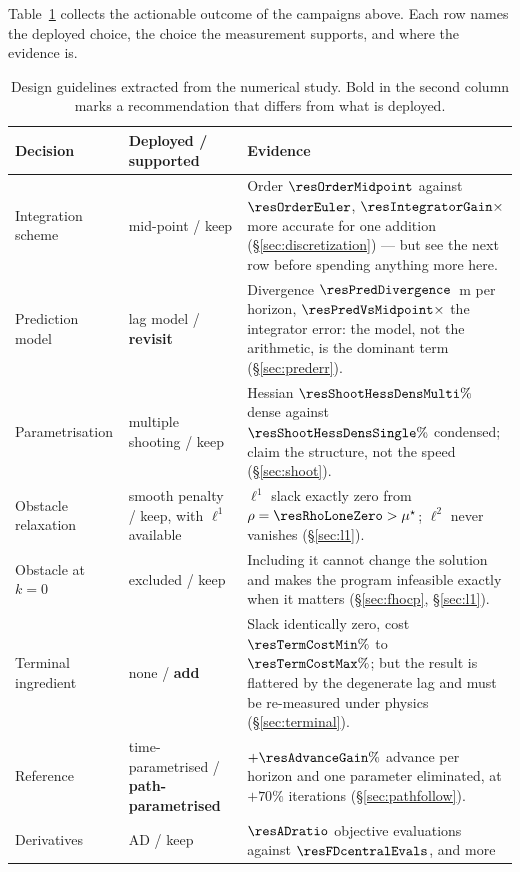 \documentclass[11pt,a4paper]{article}
\begin{document}
Table~\ref{tab:guidelines} collects the actionable outcome of the campaigns above. Each row names the
deployed choice, the choice the measurement supports, and where the evidence is.

\begin{table}[htbp]
  \centering
  \small
  \caption{Design guidelines extracted from the numerical study. Bold in the second column marks a
  recommendation that differs from what is deployed.}
  \label{tab:guidelines}
  \begin{tabular}{p{}p{}p{}}
    \toprule
    Decision & Deployed / supported & Evidence \\
    \midrule
    Integration scheme & mid-point / keep & Order $\resOrderMidpoint$ against $\resOrderEuler$,
      $\resIntegratorGain\times$ more accurate for one addition (\S\ref{sec:discretization}) --- but see the
      next row before spending anything more here. \\
    Prediction model & lag model / \textbf{revisit} & Divergence $\resPredDivergence$~m per horizon,
      $\resPredVsMidpoint\times$ the integrator error: the model, not the arithmetic, is the dominant term
      (\S\ref{sec:prederr}). \\
    Parametrisation & multiple shooting / keep & Hessian $\resShootHessDensMulti\%$ dense against
      $\resShootHessDensSingle\%$ condensed; claim the structure, not the speed (\S\ref{sec:shoot}). \\
    Obstacle relaxation & smooth penalty / keep, with $\ell^1$ available & $\ell^1$ slack exactly zero from
      $\rho=\resRhoLoneZero>\mu^\star$; $\ell^2$ never vanishes (\S\ref{sec:l1}). \\
    Obstacle at $k=0$ & excluded / keep & Including it cannot change the solution and makes the program
      infeasible exactly when it matters (\S\ref{sec:fhocp}, \S\ref{sec:l1}). \\
    Terminal ingredient & none / \textbf{add} & Slack identically zero, cost $\resTermCostMin\%$ to
      $\resTermCostMax\%$; but the result is flattered by the degenerate lag and must be re-measured under
      physics (\S\ref{sec:terminal}). \\
    Reference & time-parametrised / \textbf{path-parametrised} & $+\resAdvanceGain\%$ advance per horizon and
      one parameter eliminated, at $+70\%$ iterations (\S\ref{sec:pathfollow}). \\
    Derivatives & AD / keep & $\resADratio$ objective evaluations against $\resFDcentralEvals$, and more

\end{tabular}
\end{table}
\end{document}
